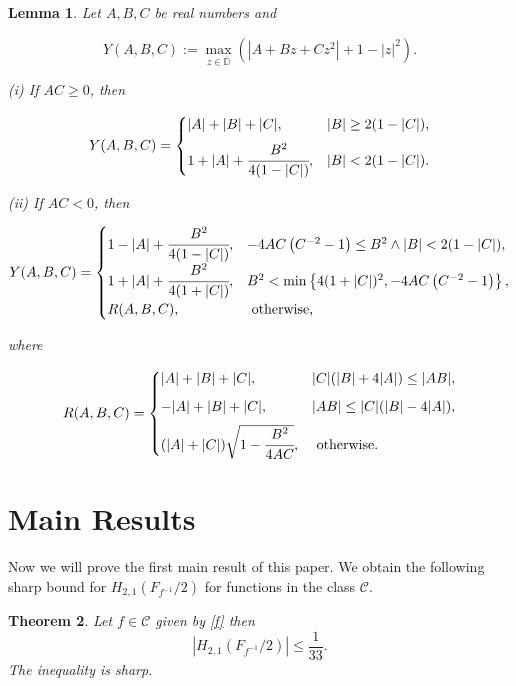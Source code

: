 \documentclass[a4paper,12pt]{amsart}
\newtheorem{theorem}{Theorem}[section]
\newtheorem{lemma}[theorem]{Lemma}
\theoremstyle{definition}
\numberwithin{equation}{section}
\begin{document}
\begin{lemma}\label{y(a,b,c)}
Let $A, B, C$ be real numbers and

$$
Y(A, B, C):=\max _{z \in \overline{\mathbb{D}}}\left(\left|A+B z+C z^{2}\right|+1-|z|^{2}\right) .
$$

(i) If $A C \geq 0$, then

$$
Y(A, B, C)= \begin{cases}|A|+|B|+|C|, & |B| \geq 2(1-|C|), \\[2mm] 1+|A|+\cfrac{B^{2}}{4(1-|C|)}, & |B|<2(1-|C|) .\end{cases}
$$

(ii) If $A C<0$, then

$$
Y(A, B, C)= \begin{cases}1-|A|+\cfrac{B^{2}}{4(1-|C|)}, & -4 A C\left(C^{-2}-1\right) \leq B^{2} \wedge|B|<2(1-|C|), \\[2mm] 1+|A|+\cfrac{B^{2}}{4(1+|C|)}, & B^{2}<\min \left\{4(1+|C|)^{2},-4 A C\left(C^{-2}-1\right)\right\}, \\[2mm] R(A, B, C), & \text { otherwise, }\end{cases}
$$

where

$$
R(A, B, C)= \begin{cases}|A|+|B|+|C|, & |C|(|B|+4|A|) \leq|A B|, \\[2mm] -|A|+|B|+|C|, & |A B| \leq|C|(|B|-4|A|), \\[2mm] (|A|+|C|) \sqrt{1-\cfrac{B^{2}}{4 A C}}, & \text { otherwise. }\end{cases}
$$
\end{lemma}





\section{Main Results}\label{sec3}
Now we will prove the first main result of this paper. We obtain the following sharp bound for $H_{2,1}(F_{f^{-1}}/2)$ for functions in the class $\mathcal{C}$.
\begin{theorem}
Let $f\in\mathcal{C}$ given by \eqref{f} then
\begin{equation}\label{thm1}
	|H_{2,1}(F_{f^{-1}}/2)| \leq \frac{1}{33}.
\end{equation}
	The inequality is sharp.

\end{theorem}
\end{document}
